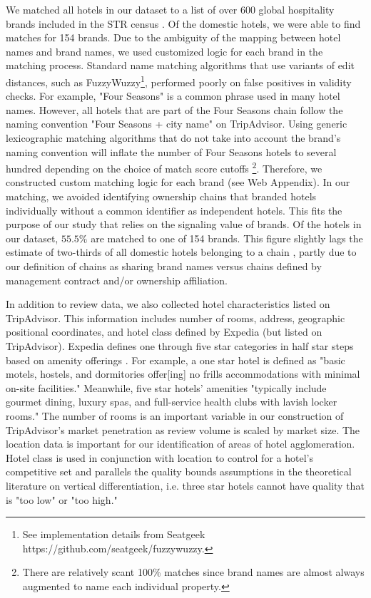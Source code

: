 \documentclass[mksc,blindrev]{informs3} %
\begin{document}
We matched all hotels in our dataset to a list of over 600 global hospitality brands included in the STR census \citep{hotelnews2015}. Of the domestic hotels, we were able to find matches for 154 brands. Due to the ambiguity of the mapping between hotel names and brand names, we used customized logic for each brand in the matching process. Standard name matching algorithms that use variants of edit distances, such as FuzzyWuzzy\footnote{See implementation details from Seatgeek https://github.com/seatgeek/fuzzywuzzy.}, performed poorly on false positives in validity checks. For example, "Four Seasons" is a common phrase used in many hotel names. However, all hotels that are part of the Four Seasons chain follow the naming convention "Four Seasons + city name" on TripAdvisor. Using generic lexicographic matching algorithms that do not take into account the brand's naming convention will inflate the number of Four Seasons hotels to several hundred depending on the choice of match score cutoffs \footnote{There are relatively scant 100\% matches since brand names are almost always augmented to name each individual property.}. Therefore, we constructed custom matching logic for each brand (see Web Appendix). In our matching, we avoided identifying ownership chains that branded hotels individually without a common identifier as independent hotels. This fits the purpose of our study that relies on the signaling value of brands. Of the hotels in our dataset, $55.5\%$ are matched to one of 154 brands. This figure slightly lags the estimate of two-thirds of all domestic hotels belonging to a chain \citep{lodging2017}, partly due to our definition of chains as sharing brand names versus chains defined by management contract and/or ownership affiliation.

In addition to review data, we also collected hotel characteristics listed on TripAdvisor. This information includes number of rooms, address, geographic positional coordinates, and hotel class defined by Expedia (but listed on TripAdvisor). Expedia defines one through five star categories in half star steps based on amenity offerings \citep{expedia2018ratings}. For example, a one star hotel is defined as "basic motels, hostels, and dormitories offer[ing] no frills accommodations with minimal on-site facilities." Meanwhile, five star hotels' amenities "typically include gourmet dining, luxury spas, and full-service health clubs with lavish locker rooms." The number of rooms is an important variable in our construction of TripAdvisor's market penetration as review volume is scaled by market size. The location data is important for our identification of areas of hotel agglomeration. Hotel class is used in conjunction with location to control for a hotel's competitive set and parallels the quality bounds assumptions in the theoretical literature on vertical differentiation, i.e. three star hotels cannot have quality that is "too low" or "too high."
\end{document}
